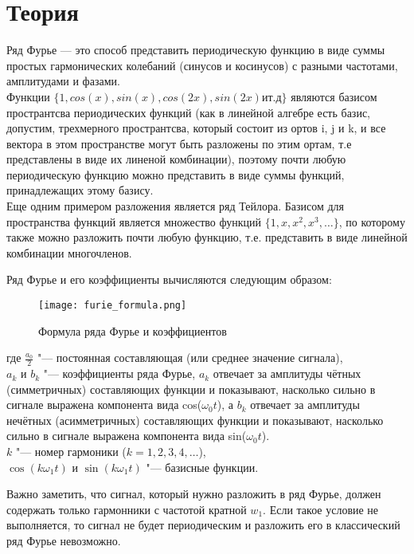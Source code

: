\chapter{Теория}
\label{ch:intro}

Ряд Фурье — это способ представить периодическую функцию в виде суммы простых гармонических колебаний 
(синусов и косинусов) с разными частотами, амплитудами и фазами. \\

Функции $\{1, cos(x), sin(x), cos(2x), sin(2x) и т.д\}$ являются базисом пространтсва периодических функций (как в линейной алгебре
есть базис, допустим, трехмерного пространтсва, который состоит из ортов i, j и k, и все вектора в этом пространстве могут быть
разложены по этим ортам, т.е представлены в виде их линеной комбинации), поэтому почти любую периодическую функцию можно представить
в виде суммы функций, принадлежащих этому базису. \\

Еще одним примером разложения является ряд Тейлора. Базисом для пространства функций является множество функций $\{1, x, x^2, x^3, \dots\}$,
по которому также можно разложить почти любую функцию, т.е. представить в виде линейной комбинации многочленов.

Ряд Фурье и его коэффициенты вычисляются следующим образом:

\begin{figure}[H]
    \centering
    \texttt{[image: furie\_formula.png]}
    \caption{Формула ряда Фурье и коэффициентов}
\end{figure}

где $\frac{a_0}{2}$ "--- постоянная составляющая (или среднее значение сигнала), \\
$a_k$ и $b_k$ "--- коэффициенты ряда Фурье, $a_k$ отвечает за амплитуды чётных (симметричных) составляющих функции
и показывают, насколько сильно в сигнале выражена компонента вида cos($\omega_0t$), а $b_k$ отвечает за амплитуды нечётных (асимметричных) составляющих функции
и показывают, насколько сильно в сигнале выражена компонента вида sin($\omega_0t$). \\
$k$ "--- номер гармоники ($k = 1,2,3,4,\dots$), \\
$\cos(k\omega_1 t)$ и $\sin(k\omega_1 t)$ "--- базисные функции.

Важно заметить, что сигнал, который нужно разложить в ряд Фурье, должен содержать только гармонники с частотой кратной $w_1$. Если
такое условие не выполняется, то сигнал не будет периодическим и разложить его в классический ряд Фурье невозможно.

